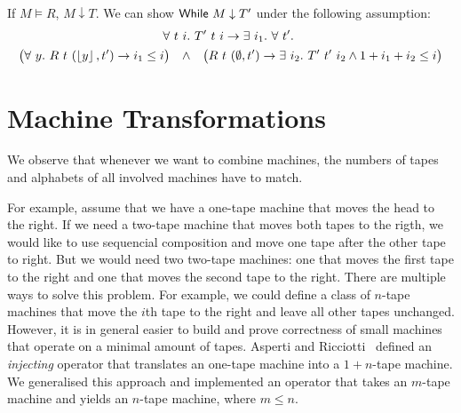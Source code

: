 \begin{lemma}
  If $M \vDash R$, $M \downarrow T$.  We can show $\textsf{While}~ M \downarrow T'$ under the following assumption:
  \begin{multline*}
    \forall~t~i.~
    T'~t~i \rightarrow
    \exists~i_1.~
    \forall~t'.~ \\
    \bigl(
    \forall~y.~ R~t~(\left\lfloor {y} \right\rfloor, t') \rightarrow i_1 \le i
    \bigl) \quad\land\quad
    \bigl(
    R~t~(\emptyset, t') \rightarrow
    \exists~i_2.~
    T'~t'~i_2 \land
    1 + i_1 + i_2 \le i
    \bigr)
  \end{multline*}
\end{lemma}







\section{Machine Transformations}
\label{sec:transformations}

We observe that whenever we want to combine machines, the numbers of tapes and alphabets of all involved machines have to match.

For example, assume that we have a one-tape machine that moves the head to the right.  If we need a two-tape machine that moves both tapes to the
rigth, we would like to use sequencial composition and move one tape after the other tape to right.  But we would need two two-tape machines: one that
moves the first tape to the right and one that moves the second tape to the right.  There are multiple ways to solve this problem.  For example, we
could define a class of $n$-tape machines that move the $i$th tape to the right and leave all other tapes unchanged.  However, it is in general easier
to build and prove correctness of small machines that operate on a minimal amount of tapes.  Asperti and Ricciotti~\cite{asperti2015} defined an
\emph{injecting} operator that translates an one-tape machine into a $1+n$-tape machine.  We generalised this approach and implemented an operator
that takes an $m$-tape machine and yields an $n$-tape machine, where $m \le n$.

